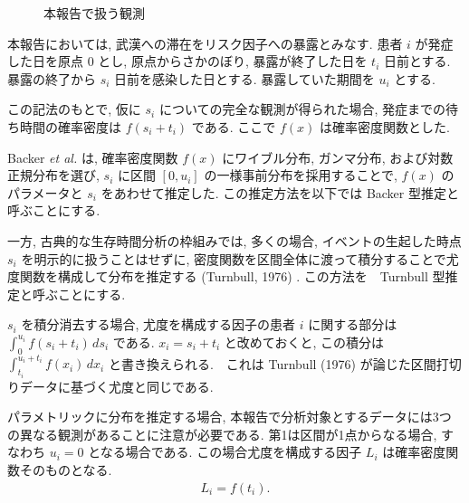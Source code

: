 \documentclass[a4paper,12pt]{jsarticle}
\begin{document}
\begin{figure}[htbp]
\centering
{}
\caption{本報告で扱う観測}
\label{concept}
\end{figure}

本報告においては, 武漢への滞在をリスク因子への暴露とみなす. 患者 $i$ が発症した日を原点 0 とし, 原点からさかのぼり, 暴露が終了した日を $t_i$ 日前とする.  暴露の終了から $s_i$ 日前を感染した日とする. 暴露していた期間を $u_i$ とする.

この記法のもとで, 仮に $s_i$ についての完全な観測が得られた場合,  発症までの待ち時間の確率密度は $f(s_i + t_i)$ である. ここで $f(x)$ は確率密度関数とした.

Backer \textit{et al.} は, 確率密度関数 $f(x)$ にワイブル分布, ガンマ分布, および対数正規分布を選び, $s_i$ に区間 $[0, u_i]$ の一様事前分布を採用することで, $f(x)$ のパラメータと $s_i$ をあわせて推定した. この推定方法を以下では Backer 型推定と呼ぶことにする. 

一方, 古典的な生存時間分析の枠組みでは, 多くの場合, イベントの生起した時点 $s_i$ を明示的に扱うことはせずに, 密度関数を区間全体に渡って積分することで尤度関数を構成して分布を推定する (Turnbull, 1976) .  この方法を　Turnbull 型推定と呼ぶことにする. 

$s_i$ を積分消去する場合,  尤度を構成する因子の患者 $i$ に関する部分は $\int_0 ^{u_i} f(s_i+t_i) \,ds_i$ である.
$x_i = s_i + t_i$ と改めておくと, この積分は $\int_{t_i} ^{u_i+t_i} f(x_i) \,dx_i$ と書き換えられる.　これは Turnbull (1976) が論じた区間打切りデータに基づく尤度と同じである. 

パラメトリックに分布を推定する場合, 本報告で分析対象とするデータには3つの異なる観測があることに注意が必要である.
第1は区間が1点からなる場合, すなわち $u_i= 0$ となる場合である. 
この場合尤度を構成する因子 $L_i$ は確率密度関数そのものとなる. 
\begin{align}
L_i = f(t_i).
\end{align}
\end{document}
